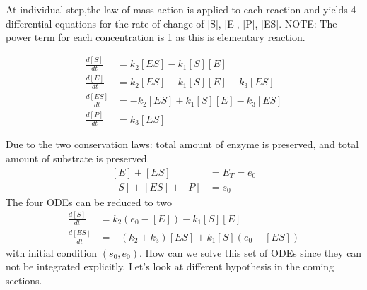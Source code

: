 At individual step,the law of mass action is applied to each reaction and
yields 4 differential equations for the rate of change of [S], [E], [P], [ES].
NOTE: The power term for each concentration is 1 as this is elementary
reaction.

\begin{equation}
  \label{eq:267}
  \begin{split}
    \frac{d[S]}{dt} &= k_{2}[ES] - k_1[S][E] \\
    \frac{d[E]}{dt} &= k_{2}[ES] - k_1[S][E] + k_3[ES] \\
    \frac{d[ES]}{dt} &= -k_{2}[ES] + k_1[S][E]  - k_3[ES] \\
    \frac{d[P]}{dt} &= k_3[ES]
  \end{split}
\end{equation}

Due to the two conservation laws: total amount of enzyme is
preserved, and total amount of substrate is preserved.
\begin{equation}
  \label{eq:279}
  \begin{split}
      [E] + [ES] &= E_T = e_0 \\
      [S] + [ES] + [P] &= s_0
  \end{split}
\end{equation}
The four ODEs can be reduced to two
\begin{equation}
  \label{eq:280}
  \begin{split}
    \frac{d[S]}{dt} &= k_{2}(e_0-[E]) - k_1[S][E] \\
    \frac{d[ES]}{dt} &= -(k_{2}+k_3)[ES] + k_1[S](e_0-[ES])
  \end{split}
\end{equation}
with initial condition $(s_0, e_0)$. How can we solve this set of ODEs
since they can not be integrated explicitly. Let's look at different
hypothesis in the coming sections.




